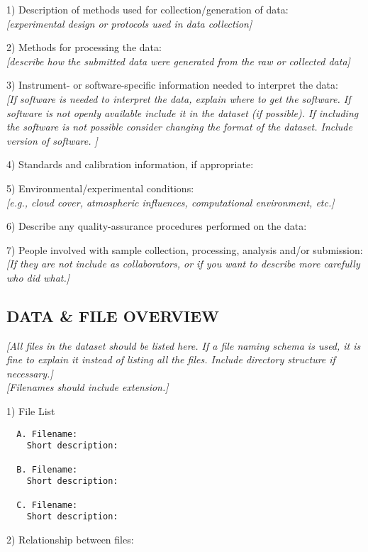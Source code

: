 \documentclass[]{article}
\begin{document}
1) Description of methods used for collection/generation of data:\\
\emph{{[}experimental design or protocols used in data collection{]}}

2) Methods for processing the data:\\
\emph{{[}describe how the submitted data were generated from the raw or
collected data{]}}

3) Instrument- or software-specific information needed to interpret the
data:\\
\emph{{[}If software is needed to interpret the data, explain where to
get the software. If software is not openly available include it in the
dataset (if possible). If including the software is not possible
consider changing the format of the dataset. Include version of
software. {]}}

4) Standards and calibration information, if appropriate:

5) Environmental/experimental conditions:\\
\emph{{[}e.g., cloud cover, atmospheric influences, computational
environment, etc.{]}}

6) Describe any quality-assurance procedures performed on the data:

7) People involved with sample collection, processing, analysis and/or
submission:\\
\emph{{[}If they are not include as collaborators, or if you want to
describe more carefully who did what.{]}}

\subsection{DATA \& FILE OVERVIEW}\label{data-file-overview}

\emph{{[}All files in the dataset should be listed here. If a file
naming schema is used, it is fine to explain it instead of listing all
the files. Include directory structure if necessary.{]}}\\
\emph{{[}Filenames should include extension.{]}}

1) File List

\begin{verbatim}
  A. Filename:
    Short description:

  B. Filename:
    Short description:

  C. Filename:
    Short description:
\end{verbatim}

2) Relationship between files:
\end{document}
